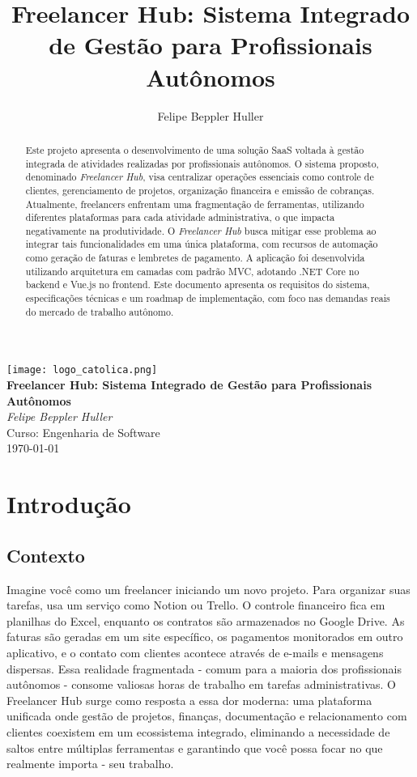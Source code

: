 \documentclass[a4paper,12pt]{article}
\title{Freelancer Hub: Sistema Integrado de Gestão para Profissionais Autônomos}
\author{Felipe Beppler Huller}
\begin{document}
\begin{titlepage}
  \centering
  \texttt{[image: logo\_catolica.png]}\\[2cm]
  {\LARGE \textbf{Freelancer Hub: Sistema Integrado de Gestão para Profissionais Autônomos}}\\[1.5cm]
  {\Large \emph{Felipe Beppler Huller}}\\[0.5cm]
  {\large Curso: Engenharia de Software}\\[0.5cm]
  
  \vfill
  {\large \today}
\end{titlepage}


\tableofcontents
\newpage

\begin{abstract}
Este projeto apresenta o desenvolvimento de uma solução SaaS voltada à gestão integrada de atividades realizadas por profissionais autônomos. O sistema proposto, denominado \textit{Freelancer Hub}, visa centralizar operações essenciais como controle de clientes, gerenciamento de projetos, organização financeira e emissão de cobranças. Atualmente, freelancers enfrentam uma fragmentação de ferramentas, utilizando diferentes plataformas para cada atividade administrativa, o que impacta negativamente na produtividade. O \textit{Freelancer Hub} busca mitigar esse problema ao integrar tais funcionalidades em uma única plataforma, com recursos de automação como geração de faturas e lembretes de pagamento. A aplicação foi desenvolvida utilizando arquitetura em camadas com padrão MVC, adotando .NET Core no backend e Vue.js no frontend. Este documento apresenta os requisitos do sistema, especificações técnicas e um roadmap de implementação, com foco nas demandas reais do mercado de trabalho autônomo.
\end{abstract}
\newpage

\section{Introdução}

\subsection{Contexto}
Imagine você como um freelancer iniciando um novo projeto. Para organizar suas tarefas, usa um serviço como Notion ou Trello. O controle financeiro fica em planilhas do Excel, enquanto os contratos são armazenados no Google Drive. As faturas são geradas em um site específico, os pagamentos monitorados em outro aplicativo, e o contato com clientes acontece através de e-mails e mensagens dispersas. Essa realidade fragmentada - comum para a maioria dos profissionais autônomos - consome valiosas horas de trabalho em tarefas administrativas. O Freelancer Hub surge como resposta a essa dor moderna: uma plataforma unificada onde gestão de projetos, finanças, documentação e relacionamento com clientes coexistem em um ecossistema integrado, eliminando a necessidade de saltos entre múltiplas ferramentas e garantindo que você possa focar no que realmente importa - seu trabalho.
\end{document}

